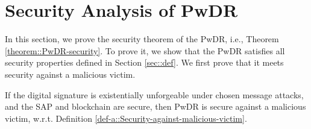 
\vspace{-3mm}
\section{Security Analysis of  PwDR}\label{sec::proof}
\vspace{-1mm}
In this section, we prove the security theorem of the PwDR, i.e., Theorem \ref{theorem::PwDR-security}. %
%
To prove it, we show that the PwDR satisfies all security properties defined in Section \ref{sec::def}. We first prove that it meets security against a malicious victim. 

\vspace{-1mm}
\begin{lemma}\label{lemma::secure-against-a-malicious-victim} If the digital signature is existentially unforgeable under chosen message attacks, and the SAP and blockchain are secure, then PwDR is secure against a malicious victim, w.r.t. Definition \ref{def-a::Security-against-malicious-victim}. 
\end{lemma}



